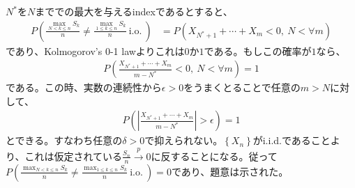 \documentclass{article}
\begin{document}
$N^{*}$を$N$まででの最大を与えるindexであるとすると、
\begin{align*}
	P\left( \frac{\max_{N<k\leq n} S_k}{n} \neq \frac{\max_{1\leq k\leq n} S_k}{n}\ \text{i.o.}\ \right) &= P\left( X_{N^{*} + 1} + \cdots + X_m < 0,\ N < \forall m \right)
\end{align*}
であり、Kolmogorov's 0-1 lawよりこれは$0$か$1$である。もしこの確率が$1$なら、
\begin{align*}
	P\left( \frac{X_{N^{*} + 1} + \cdots + X_m}{m-N^{*}} < 0,\ N < \forall m \right) = 1
\end{align*}
である。この時、実数の連続性から$\epsilon > 0$をうまくとることで任意の$m > N$に対して、
\begin{align*}
	P\left( \left| \frac{X_{N^{*} + 1} + \cdots + X_m}{m-N^{*}}\right| > \epsilon \right) = 1
\end{align*}
とできる。すなわち任意の$\delta > 0$で抑えられない。$\left\{ X_n \right\}$がi.i.d.であることより、これは仮定されている$\frac{S_n}{n} \xrightarrow{p} 0$に反することになる。従って$P\left( \frac{\max_{N<k\leq n} S_k}{n} \neq \frac{\max_{1\leq k\leq n} S_k}{n}\ \text{i.o.}\ \right) = 0$であり、題意は示された。
\end{document}
